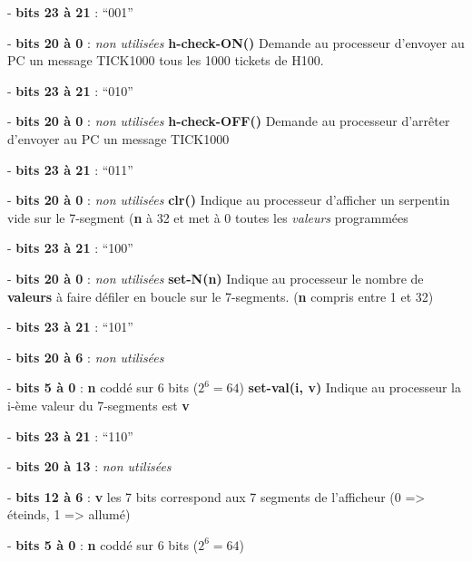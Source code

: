 \documentclass[10pt]{article}
\begin{document}
        - \textbf{bits 23 à 21} : ``001''

        - \textbf{bits 20 à 0} : \textit{non utilisées}
        \newline
        \newline
        \textbf{h-check-ON()} Demande au processeur d'envoyer au PC un message TICK1000 tous les 1000 tickets de H100.
        
        - \textbf{bits 23 à 21} : ``010''

        - \textbf{bits 20 à 0} : \textit{non utilisées}
        \newpage
        \textbf{h-check-OFF()} Demande au processeur d'arrêter d'envoyer au PC un message TICK1000
        
        - \textbf{bits 23 à 21} : ``011''

        - \textbf{bits 20 à 0} : \textit{non utilisées}
        \newline
        \newline
        \textbf{clr()} Indique au processeur d'afficher un serpentin vide sur le 7-segment (\textbf{n} à 32 et met à 0 toutes les \textit{valeurs} programmées
        
        - \textbf{bits 23 à 21} : ``100''

        - \textbf{bits 20 à 0} : \textit{non utilisées}
        \newline
        \newline
        \textbf{set-N(n)} Indique au processeur le nombre de \textbf{valeurs} à faire défiler en boucle sur le 7-segments. (\textbf{n} compris entre 1 et 32)\label{N}
        
        - \textbf{bits 23 à 21} : ``101''

        - \textbf{bits 20 à 6} : \textit{non utilisées} 

        - \textbf{bits 5 à 0} : \textbf{n} coddé sur 6 bits ($2^6 = 64$)
        \newline
        \newline
        \textbf{set-val(i, v)} Indique au processeur la i-ème valeur du 7-segments est \textbf{v}
        
        - \textbf{bits 23 à 21} : ``110''

        - \textbf{bits 20 à 13} : \textit{non utilisées} 

        - \textbf{bits 12 à 6} : \textbf{v} les 7 bits correspond aux 7 segments de l'afficheur (0 => éteinds, 1 => allumé)

        - \textbf{bits 5 à 0} : \textbf{n} coddé sur 6 bits ($2^6 = 64$)
\end{document}

